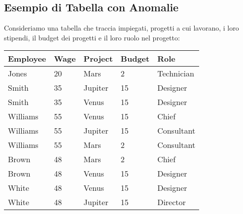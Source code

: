 	\subsection{Esempio di Tabella con Anomalie}
	Consideriamo una tabella che traccia impiegati, progetti a cui lavorano, i loro stipendi, il budget dei progetti e il loro ruolo nel progetto:
	
	\begin{center}
		\begin{tabular}{lllll}
			\toprule
			\textbf{Employee} & \textbf{Wage} & \textbf{Project} & \textbf{Budget} & \textbf{Role} \\
			\midrule
			Jones    & 20   & Mars     & 2      & Technician \\
			Smith    & 35   & Jupiter  & 15     & Designer   \\
			Smith    & 35   & Venus    & 15     & Designer   \\
			Williams & 55   & Venus    & 15     & Chief      \\
			Williams & 55   & Jupiter  & 15     & Consultant \\
			Williams & 55   & Mars     & 2      & Consultant \\
			Brown    & 48   & Mars     & 2      & Chief      \\
			Brown    & 48   & Venus    & 15     & Designer   \\
			White    & 48   & Venus    & 15     & Designer   \\
			White    & 48   & Jupiter  & 15     & Director   \\
			\bottomrule
		\end{tabular}
	\end{center}
	
